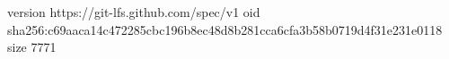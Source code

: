 version https://git-lfs.github.com/spec/v1
oid sha256:c69aaca14c472285cbc196b8ec48d8b281cca6cfa3b58b0719d4f31e231e0118
size 7771
